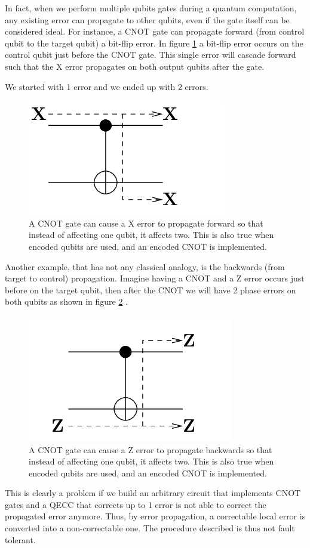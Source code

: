 In fact, when we perform multiple qubits gates during a quantum computation, any existing error can propagate to other qubits, even if the gate itself can be considered ideal.
For instance, a CNOT gate can propagate forward (from control qubit to the target qubit) a bit-flip error. In figure \ref{fig:CNOT_prop} a bit-flip error occurs on the control qubit just before the CNOT gate.
This single error will cascade forward such that the X error propagates on both output qubits after the gate.

We started with 1 error and we ended up with 2 errors. 
\begin{figure}[h!]
    \centering
    \includegraphics[scale=0.5]{Mainmatter/images/XCNOT.png}
    \caption{A CNOT gate can cause a X error to propagate forward so that instead of affecting one qubit, it affects two. This is also true when encoded qubits are used, and an encoded CNOT is implemented.}
    \label{fig:CNOT_prop}
\end{figure}
\renewcommand{\arraystretch}{1}
Another example, that has not any classical analogy, is the backwards (from target to control) propagation. Imagine having a CNOT and a Z error occurs just before on the target qubit, then after the CNOT we will have 2 phase errors on both qubits as shown in figure \ref{fig:CNOT_prop2} .

\begin{figure}[h!]
    \centering
    \includegraphics[scale=0.5]{Mainmatter/images/ZCNOT.png}
    \caption{A CNOT gate can cause a Z error to propagate backwards so that instead of affecting one qubit, it affects two. This is also true when encoded qubits are used, and an encoded CNOT is implemented.}
    \label{fig:CNOT_prop2}
\end{figure}
This is clearly a problem if we build an arbitrary circuit that implements CNOT gates and a QECC that corrects up to 1 error is not able to correct the propagated error anymore.
Thus, by error propagation, a correctable local error is converted into a non-correctable one. The procedure described is thus not fault tolerant.




